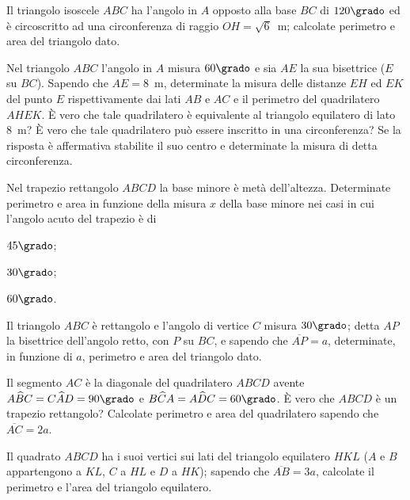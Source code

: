 \begin{multicols}{2}
\begin{esercizio}
\label{ese:7.30}
Il triangolo isoscele $ABC$ ha l'angolo in $A$ opposto alla base $BC$ 
di $120\grado$ ed è circoscritto ad una circonferenza di raggio 
$OH=\sqrt{6}$~m; calcolate perimetro e area del triangolo dato.
\end{esercizio}

\begin{esercizio}
\label{ese:7.31}
Nel triangolo $ABC$ l'angolo in $A$ misura $60\grado$ e sia $AE$ la 
sua bisettrice ($E$ su $BC$). Sapendo che $AE=8$~m, determinate la 
misura delle distanze $EH$ ed $EK$ del punto $E$ rispettivamente dai 
lati $AB$ e $AC$ e il perimetro del quadrilatero $AHEK$. \`E vero che 
tale quadrilatero è equivalente al triangolo equilatero di lato 8~m? 
\`E vero che tale quadrilatero può essere inscritto in una 
circonferenza? Se la risposta è affermativa stabilite il suo centro e 
determinate la misura di detta circonferenza.
\end{esercizio}

\begin{esercizio}
\label{ese:7.32}
Nel trapezio rettangolo $ABCD$ la base minore è metà dell'altezza. 
Determinate perimetro e area in funzione della misura $x$ della base 
minore nei casi in cui l'angolo acuto del trapezio è di
\begin{enumeratea}
\item $45\grado$;
\item $30\grado$;
\item $60\grado$.
\end{enumeratea}
\end{esercizio}

\begin{esercizio}
\label{ese:7.33}
Il triangolo $ABC$ è rettangolo e l'angolo di vertice $C$ misura 
$30\grado$; detta $AP$ la bisettrice dell'angolo retto, con $P$ su 
$BC$, e sapendo che $\overline{AP}=a$, determinate, in funzione di 
$a$, perimetro e area del triangolo dato.
\end{esercizio}

\begin{esercizio}
\label{ese:7.34}
Il segmento $AC$ è la diagonale del quadrilatero $ABCD$ avente 
$A\widehat{B}C=C\widehat{A}D=90\grado$ e 
$B\widehat{C}A=A\widehat{D}C=60\grado$. \`E vero che $ABCD$ è un 
trapezio rettangolo? Calcolate perimetro e area del quadrilatero 
sapendo che $\overline{AC}=2a$.
\end{esercizio}

\begin{esercizio}
\label{ese:7.35}
Il quadrato $ABCD$ ha i suoi vertici sui lati del triangolo 
equilatero $HKL$ ($A$ e $B$ appartengono a $KL$, $C$ a $HL$ e $D$ a 
$HK$); sapendo che $\overline{AB}=3a$, calcolate il perimetro e l'area 
del triangolo equilatero.
\end{esercizio}


\end{multicols}
